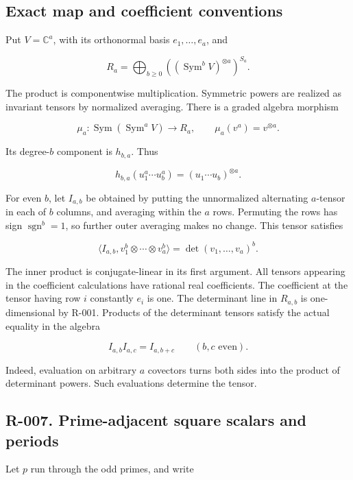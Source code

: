 \documentclass[
  10pt,
]{article}
\begin{document}
\subsection{Exact map and coefficient
conventions}\label{exact-map-and-coefficient-conventions}

Put \(V=\mathbb C^a\), with its orthonormal basis \(e_1,\ldots,e_a\),
and

\[
 R_a=\bigoplus_{b\ge0}\left((\operatorname{Sym}^b V)^{\otimes a}\right)^{S_a}.
\]

The product is componentwise multiplication. Symmetric powers are
realized as invariant tensors by normalized averaging. There is a graded
algebra morphism

\[
 \mu_a:\operatorname{Sym}(\operatorname{Sym}^aV)\longrightarrow R_a,
 \qquad \mu_a(v^a)=v^{\otimes a}.
 \tag{B1}
\]

Its degree-\(b\) component is \(h_{b,a}\). Thus

\[
 h_{b,a}(u_1^a\cdots u_b^a)=(u_1\cdots u_b)^{\otimes a}.
 \tag{B2}
\]

For even \(b\), let \(I_{a,b}\) be obtained by putting the unnormalized
alternating \(a\)-tensor in each of \(b\) columns, and averaging within
the \(a\) rows. Permuting the rows has sign \(\operatorname{sgn}^b=1\),
so further outer averaging makes no change. This tensor satisfies

\[
 \langle I_{a,b},v_1^b\otimes\cdots\otimes v_a^b\rangle
       =\det(v_1,\ldots,v_a)^b.
 \tag{B3}
\]

The inner product is conjugate-linear in its first argument. All tensors
appearing in the coefficient calculations have rational real
coefficients. The coefficient at the tensor having row \(i\) constantly
\(e_i\) is one. The determinant line in \(R_{a,b}\) is one-dimensional
by R-001. Products of the determinant tensors satisfy the actual
equality in the algebra

\[
 I_{a,b}I_{a,c}=I_{a,b+c}\qquad(b,c\text{ even}).
 \tag{B4}
\]

Indeed, evaluation on arbitrary \(a\) covectors turns both sides into
the product of determinant powers. Such evaluations determine the
tensor.

\subsection{R-007. Prime-adjacent square scalars and
periods}\label{r-007.-prime-adjacent-square-scalars-and-periods}

Let \(p\) run through the odd primes, and write
\end{document}
